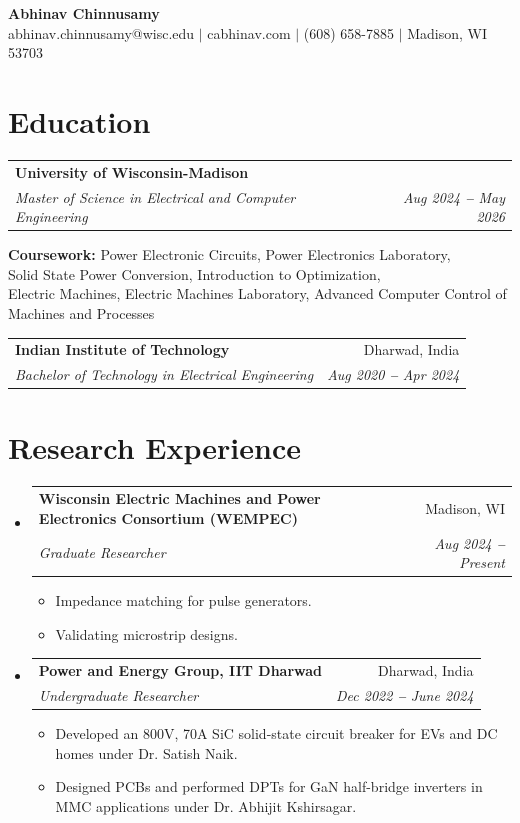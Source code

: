 \documentclass[letterpaper,11pt]{article}
\makeatletter
\newlength{\resumeTableWidth}
\newlength{\resumeListMargin}
\newlength{\resumeItemSpacing}
\newlength{\resumeSubHeadingSpacing}
\newlength{\resumeEducationSpacing}
\newcommand{\resumeItem}[1]{
  \item\small{
    {#1 \vspace{\resumeItemSpacing}}
  }
}
\newcommand{\resumeSubheading}[4]{
  \vspace{\resumeItemSpacing}\item
    \begin{tabular*}{\resumeTableWidth}[t]{l@{\extracolsep{\fill}}r}
      \textbf{#1} & #2 \\
      \textit{\small#3} & \textit{\small #4} \\
    \end{tabular*}\vspace{\resumeSubHeadingSpacing}
}
\newcommand{\resumeSubHeadingListStart}{\begin{itemize}[leftmargin=\resumeListMargin, label={}]}
\newcommand{\resumeSubHeadingListEnd}{\end{itemize}}
\newcommand{\resumeItemListStart}{\begin{itemize}}
\newcommand{\resumeItemListEnd}{\end{itemize}\vspace{\resumeEducationSpacing}}
\makeatother
\begin{document}
\begin{center}
    \textbf{\Huge Abhinav Chinnusamy} \\ \vspace{3pt}
    \small
    abhinav.chinnusamy@wisc.edu
    $|$
    cabhinav.com
    $|$
    (608) 658-7885
    $|$
    Madison, WI 53703
\end{center}

\section{Education}
\vspace{3pt}
\resumeSubHeadingListStart
  \resumeSubheading
    {University of Wisconsin-Madison}{}
    {Master of Science in Electrical and Computer Engineering }{Aug 2024 \textbf{--} May 2026}
    \vspace{2pt}
    \resumeSubHeadingListStart
      \small{\item{
        \textbf{Coursework:} Power Electronic Circuits, Power Electronics Laboratory, \\
        Solid State Power Conversion, Introduction to Optimization, \\
        Electric Machines, Electric Machines Laboratory, Advanced Computer Control of Machines and Processes
      }}
    \resumeSubHeadingListEnd

  \resumeSubheading
    {Indian Institute of Technology}{Dharwad, India}
    {Bachelor of Technology in Electrical Engineering}{Aug 2020 \textbf{--} Apr 2024}
\resumeSubHeadingListEnd

\vspace{3pt}

\section{Research Experience}
\vspace{3pt}
\resumeSubHeadingListStart
  \resumeSubheading
    {Wisconsin Electric Machines and Power Electronics Consortium (WEMPEC)}{Madison, WI}
    {Graduate Researcher}{Aug 2024 \textbf{--} Present}
    \resumeItemListStart
      \resumeItem{Impedance matching for pulse generators.}
      \resumeItem{Validating microstrip designs.}
    \resumeItemListEnd

  \resumeSubheading
    {Power and Energy Group, IIT Dharwad}{Dharwad, India}
    {Undergraduate Researcher}{Dec 2022 \textbf{--} June 2024}
    \resumeItemListStart
      \resumeItem{Developed an 800V, 70A SiC solid-state circuit breaker for EVs and DC homes under Dr. Satish Naik.}
      \resumeItem{Designed PCBs and performed DPTs for GaN half-bridge inverters in MMC applications under Dr. Abhijit Kshirsagar.}
    \resumeItemListEnd
\resumeSubHeadingListEnd
\end{document}
